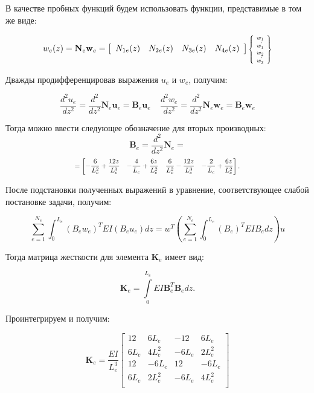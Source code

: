 \documentclass[7pt]{beamer}
\numberwithin{equation}{section}
\newcommand*{\Scale}[2][4]{\scalebox{#1}{$#2$}}
\begin{document}
\begin{frame}
	В качестве пробных функций будем использовать функции, представимые в том же виде:
	\begin{block}{}
				\[w_e(z)=\textbf{N}_e \textbf{w}_{e}=
				\left[
				\begin{array}{cccc}
					N_{1e}(z) & N_{2e}(z) & N_{3e}(z) & N_{4e}(z)
				\end{array}
				\right]
				\Scale[0.7]{
					\left\{
					\begin{array}{ccc}
						w_{1}   \\
						w^{'}_{1}  \\
							w_{2}\\
							w^{'}_{2}\\
					\end{array}
					\right\}
				}
			\]	
	\end{block}
	Дважды продифференцировав выражения $u_e$ и $w_e$, получим:
	\begin{block}{}
		\[
			\frac{d^{2}u_e}{dz^{2}}=\frac{d^{2}}{dz^{2}}\textbf{N}_e \textbf{u}_e=\textbf{B}_e \textbf{u}_e ~~~~~\frac{d^{2}w_e}{dz^{2}}=\frac{d^{2}}{dz^{2}}\textbf{N}_e \textbf{w}_e=\textbf{B}_e \textbf{w}_e
		\]
	\end{block}
	Тогда можно ввести следующее обозначение для вторых производных:
	\[\textbf{B}_e=\frac{d^{2}}{dz^{2}}\textbf{N}_e=\]
	\begin{equation*}
		\Scale[0.8] {
			=\begin{bmatrix}
				\displaystyle-\frac{6}{L_e^{2}}+\frac{12z}{L_e^{3}} &  \displaystyle-\frac{4}{L_e}+\frac{6z}{L_e^{2}} &   \displaystyle\frac{6}{L_e^{2}}-\frac{12z}{L_e^{3}} &  \displaystyle-\frac{2}{L_e}+\frac{6z}{L_e^{2}}
			\end{bmatrix}.
		}
	\end{equation*}
\end{frame}

\begin{frame}
	После подстановки полученных выражений в уравнение, соответствующее слабой постановке задачи, получим:
	\begin{block}{}
		\[
			\sum_{e=1}^{N_{e}} \int_{0}^{L_e}(B_e w_e)^{T}EI(B_e u_e)dz=w^{T}\left(\sum_{e=1}^{N_e}\int_{0}^{L_e}(B_e)^{T}EI B_e dz\right)u
		\]
	\end{block}

	Тогда матрица жесткости для элемента $\textbf{K}_e$ имеет вид:
	\begin{block}{}
		\[\textbf{K}_e=\int\limits_{0}^{L_e}EI\textbf{B}_e^{T}\textbf{B}_e dz.\]
	\end{block}

	Проинтегрируем и получим:
	\begin{block}{}
		\[\textbf{K}_e=\frac{EI}{L_e^{3}}
		\left[
		\begin{array}{cccc}
			12 & 6L_e & -12 & 6L_e\\
			6L_e & 4L_e^{2} & -6L_e & 2L_e^{2}\\
				12 & -6L_e & 12 & -6L_e\\
				6L_e & 2L_e^{2} & -6L_e & 4L_e^{2}\\
		\end{array}
		\right]
		\]
	\end{block}
\end{frame}
\end{document}

